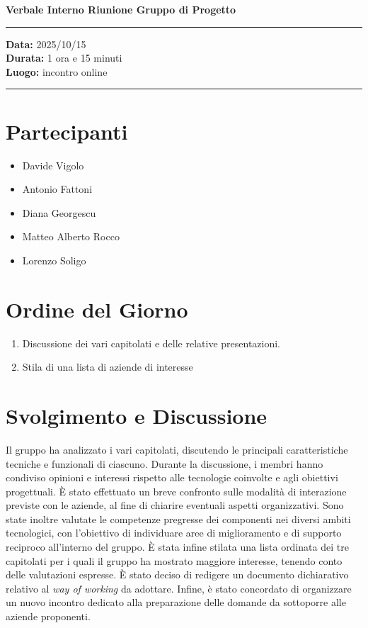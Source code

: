 \documentclass[a4paper,12pt]{article}
\begin{document}
\begin{center}
    \Large \textbf{Verbale Interno Riunione Gruppo di Progetto}

\end{center}

\vspace{0.3cm}
\hrule
\vspace{0.5cm}

\noindent
\textbf{Data:} 2025/10/15 \\
\textbf{Durata:} 1 ora e 15 minuti \\
\textbf{Luogo:} incontro online

\vspace{0.3cm}
\hrule
\vspace{0.5cm}

\section*{Partecipanti}
\begin{itemize}[noitemsep]
    \item Davide Vigolo
    \item Antonio Fattoni
    \item Diana Georgescu
    \item Matteo Alberto Rocco
    \item Lorenzo Soligo
\end{itemize}

\vspace{0.5cm}
\section*{Ordine del Giorno}
\begin{enumerate}
    \item Discussione dei vari capitolati e delle relative presentazioni.
    \item Stila di una lista di aziende di interesse
\end{enumerate}

\vspace{0.5cm}
\section*{Svolgimento e Discussione}
Il gruppo ha analizzato i vari capitolati, discutendo le principali caratteristiche tecniche e funzionali di ciascuno. 
Durante la discussione, i membri hanno condiviso opinioni e interessi rispetto alle tecnologie coinvolte e agli obiettivi progettuali. 
È stato effettuato un breve confronto sulle modalità di interazione previste con le aziende, al fine di chiarire eventuali aspetti organizzativi. 
Sono state inoltre valutate le competenze pregresse dei componenti nei diversi ambiti tecnologici, con l’obiettivo di individuare aree di miglioramento e di supporto reciproco all’interno del gruppo. 
È stata infine stilata una lista ordinata dei tre capitolati per i quali il gruppo ha mostrato maggiore interesse, tenendo conto delle valutazioni espresse. 
È stato deciso di redigere un documento dichiarativo relativo al \textit{way of working} da adottare. 
Infine, è stato concordato di organizzare un nuovo incontro dedicato alla preparazione delle domande da sottoporre alle aziende proponenti.
\end{document}
